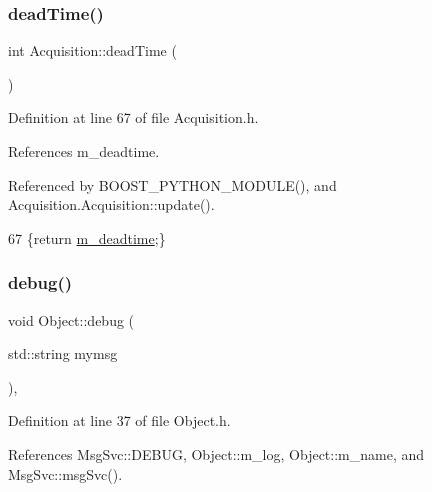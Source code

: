 \subsubsection{\texorpdfstring{dead\+Time()}{deadTime()}}
{\footnotesize\ttfamily int Acquisition\+::dead\+Time (\begin{DoxyParamCaption}{ }\end{DoxyParamCaption})\hspace{0.3cm}{\ttfamily [inline]}}



Definition at line 67 of file Acquisition.\+h.



References m\+\_\+deadtime.



Referenced by B\+O\+O\+S\+T\+\_\+\+P\+Y\+T\+H\+O\+N\+\_\+\+M\+O\+D\+U\+L\+E(), and Acquisition.\+Acquisition\+::update().


\begin{DoxyCode}
67 \{\textcolor{keywordflow}{return} \hyperlink{classAcquisition_a5f7fe20506e7d860ed61935255adfe17}{m\_deadtime};\}
\end{DoxyCode}
\mbox{\label{classObject_aac010553f022165573714b7014a15f0d}} 
\subsubsection{\texorpdfstring{debug()}{debug()}\hspace{0.1cm}{\footnotesize\ttfamily [1/2]}}
{\footnotesize\ttfamily void Object\+::debug (\begin{DoxyParamCaption}\item[{std\+::string}]{mymsg }\end{DoxyParamCaption})\hspace{0.3cm}{\ttfamily [inline]}, {\ttfamily [inherited]}}



Definition at line 37 of file Object.\+h.



References Msg\+Svc\+::\+D\+E\+B\+UG, Object\+::m\+\_\+log, Object\+::m\+\_\+name, and Msg\+Svc\+::msg\+Svc().




